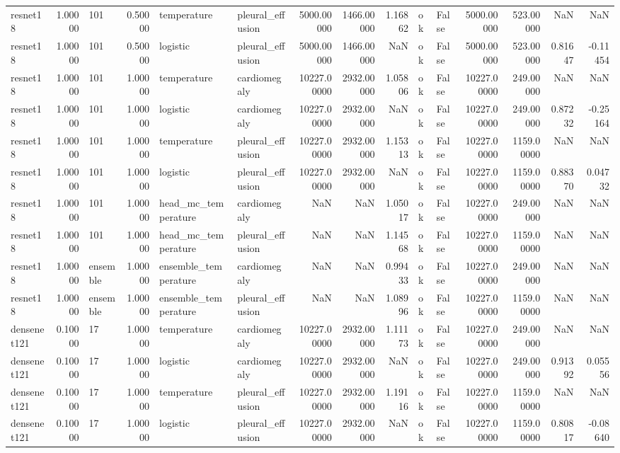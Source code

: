 \begin{tabular}{lrlrllrrrllrrrr}
resnet18 & 1.00000 & 101 & 0.50000 & temperature & pleural\_effusion & 5000.00000 & 1466.00000 & 1.16862 & ok & False & 5000.00000 & 523.00000 & NaN & NaN \\
resnet18 & 1.00000 & 101 & 0.50000 & logistic & pleural\_effusion & 5000.00000 & 1466.00000 & NaN & ok & False & 5000.00000 & 523.00000 & 0.81647 & -0.11454 \\
resnet18 & 1.00000 & 101 & 1.00000 & temperature & cardiomegaly & 10227.00000 & 2932.00000 & 1.05806 & ok & False & 10227.00000 & 249.00000 & NaN & NaN \\
resnet18 & 1.00000 & 101 & 1.00000 & logistic & cardiomegaly & 10227.00000 & 2932.00000 & NaN & ok & False & 10227.00000 & 249.00000 & 0.87232 & -0.25164 \\
resnet18 & 1.00000 & 101 & 1.00000 & temperature & pleural\_effusion & 10227.00000 & 2932.00000 & 1.15313 & ok & False & 10227.00000 & 1159.00000 & NaN & NaN \\
resnet18 & 1.00000 & 101 & 1.00000 & logistic & pleural\_effusion & 10227.00000 & 2932.00000 & NaN & ok & False & 10227.00000 & 1159.00000 & 0.88370 & 0.04732 \\
resnet18 & 1.00000 & 101 & 1.00000 & head\_mc\_temperature & cardiomegaly & NaN & NaN & 1.05017 & ok & False & 10227.00000 & 249.00000 & NaN & NaN \\
resnet18 & 1.00000 & 101 & 1.00000 & head\_mc\_temperature & pleural\_effusion & NaN & NaN & 1.14568 & ok & False & 10227.00000 & 1159.00000 & NaN & NaN \\
resnet18 & 1.00000 & ensemble & 1.00000 & ensemble\_temperature & cardiomegaly & NaN & NaN & 0.99433 & ok & False & 10227.00000 & 249.00000 & NaN & NaN \\
resnet18 & 1.00000 & ensemble & 1.00000 & ensemble\_temperature & pleural\_effusion & NaN & NaN & 1.08996 & ok & False & 10227.00000 & 1159.00000 & NaN & NaN \\
densenet121 & 0.10000 & 17 & 1.00000 & temperature & cardiomegaly & 10227.00000 & 2932.00000 & 1.11173 & ok & False & 10227.00000 & 249.00000 & NaN & NaN \\
densenet121 & 0.10000 & 17 & 1.00000 & logistic & cardiomegaly & 10227.00000 & 2932.00000 & NaN & ok & False & 10227.00000 & 249.00000 & 0.91392 & 0.05556 \\
densenet121 & 0.10000 & 17 & 1.00000 & temperature & pleural\_effusion & 10227.00000 & 2932.00000 & 1.19116 & ok & False & 10227.00000 & 1159.00000 & NaN & NaN \\
densenet121 & 0.10000 & 17 & 1.00000 & logistic & pleural\_effusion & 10227.00000 & 2932.00000 & NaN & ok & False & 10227.00000 & 1159.00000 & 0.80817 & -0.08640 \\

\end{tabular}

